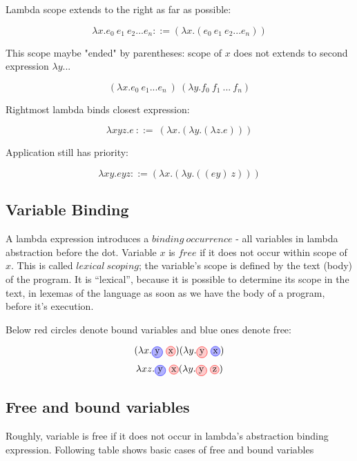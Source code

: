 Lambda scope extends to the right as far as possible:

\[\lambda{x}.e_0\ e_1\ e_2 ... e_n ::= (\lambda{x}.(e_0\ e_1\ e_2 ... e_n ))\]

This scope maybe "ended" by parentheses: scope of $x$ does not extends to second expression $\lambda{y}...$

\[(\lambda{x}.e_0\ e_1 ... e_n\ )\ (\lambda{y}.f_0\ f_1\ ...\ f_n)\]

Rightmost lambda binds closest expression:

\[\lambda{xyz}.e\ ::= \ (\lambda{x}.(\lambda{y}.(\lambda{z}.e))) \]

Application still has priority:

\[ \lambda{xy}.eyz ::= (\lambda{x}.(\lambda{y}.((ey)\ z))) \]

\subsection{Variable Binding}
A lambda expression introduces a $binding\ occurrence$ - all variables in lambda abstraction before the dot. 
Variable $x$ is $free$ if it does not occur within scope of \lam$x$.
This is called $lexical\ scoping$; the variable's scope is
defined by the text (body) of the program. It is ``lexical'', because it is
possible to determine its scope in the text, in lexemas of the language as soon as we have 
the body of a program, before it's execution.


Below red circles denote bound variables and blue ones denote free:

\[ (\lambda{x}.\circleblue{y}\ \circlered{x}) (\lambda{y}.\circlered{y}\ \circleblue{x}) \]
\[ \lambda{xz}.\circleblue{y}\ \circlered{x} (\lambda{y}.\circlered{y}\ \circlered{z}) \]

\subsection{Free and bound variables}
Roughly, variable is free if it does not occur in lambda's abstraction binding expression. Following table shows basic cases of
free and bound variables

